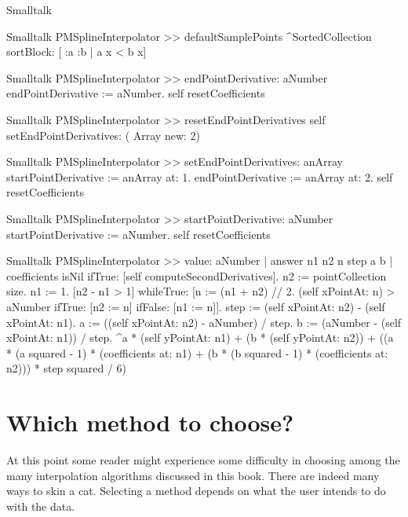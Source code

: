 \begin{displaycode}{Smalltalk}
\end{displaycode}

\begin{displaycode}{Smalltalk}
PMSplineInterpolator >> defaultSamplePoints
    ^SortedCollection sortBlock: [ :a :b | a x < b x]
\end{displaycode}

\begin{displaycode}{Smalltalk}
PMSplineInterpolator >> endPointDerivative: aNumber
    endPointDerivative := aNumber.
    self resetCoefficients
\end{displaycode}

\begin{displaycode}{Smalltalk}
PMSplineInterpolator >> resetEndPointDerivatives
    self setEndPointDerivatives: ( Array new: 2)
\end{displaycode}

\begin{displaycode}{Smalltalk}
PMSplineInterpolator >> setEndPointDerivatives: anArray
    startPointDerivative := anArray at: 1.
    endPointDerivative := anArray at: 2.
    self resetCoefficients
\end{displaycode}

\begin{displaycode}{Smalltalk}
PMSplineInterpolator >> startPointDerivative: aNumber
    startPointDerivative := aNumber.
    self resetCoefficients
\end{displaycode}

\begin{displaycode}{Smalltalk}
PMSplineInterpolator >> value: aNumber
    | answer n1 n2 n step a b |
    coefficients isNil ifTrue: [self computeSecondDerivatives].
    n2 := pointCollection size.
    n1 := 1.
    [n2 - n1 > 1] whileTrue: 
            [n := (n1 + n2) // 2.
            (self xPointAt:  n) > aNumber ifTrue: [n2 := n] ifFalse: 
                                                           [n1 := n]].
    step := (self xPointAt: n2) - (self xPointAt: n1).
    a := ((self xPointAt: n2) - aNumber) / step.
    b := (aNumber - (self xPointAt: n1)) / step.
    ^a * (self yPointAt: n1) + (b * (self yPointAt: n2)) 
        + ((a * (a squared - 1) * (coefficients at: n1) 
                + (b * (b squared - 1) * (coefficients at: n2))) * 
                                                         step squared 
                / 6)
\end{displaycode}

\section{Which method to choose?}
At this point some reader might experience some difficulty in
choosing among the many interpolation algorithms discussed in this
book. There are indeed many ways to skin a cat. Selecting a method
depends on what the user intends to do with the data.

